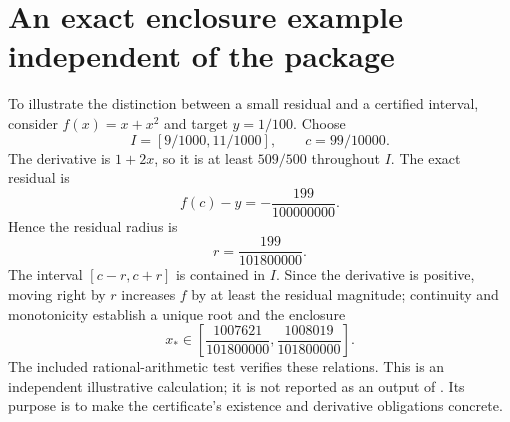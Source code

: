 \section{An exact enclosure example independent of the package}

To illustrate the distinction between a small residual and a certified interval, consider $f(x)=x+x^2$ and target $y=1/100$. Choose
\[
 I=[9/1000,11/1000],\qquad c=99/10000.
\]
The derivative is $1+2x$, so it is at least $509/500$ throughout $I$. The exact residual is
\[
 f(c)-y=-\frac{199}{100000000}.
\]
Hence the residual radius is
\[
 r=\frac{199}{101800000}.
\]
The interval $[c-r,c+r]$ is contained in $I$. Since the derivative is positive, moving right by $r$ increases $f$ by at least the residual magnitude; continuity and monotonicity establish a unique root and the enclosure
\[
 x_*\in\left[\frac{1007621}{101800000},
                 \frac{1008019}{101800000}\right].
\]
The included rational-arithmetic test verifies these relations. This is an independent illustrative calculation; it is not reported as an output of . Its purpose is to make the certificate's existence and derivative obligations concrete.

